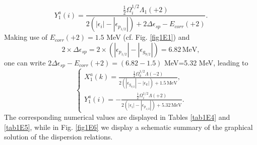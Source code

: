 \begin{equation}\label{eq3.5.8}
Y_1^a(i)=\frac{\frac{1}{2}\Omega_i^{1/2}\Lambda_1(+2)}{2(|\epsilon_i|-|\epsilon_{p_{1/2}}|)+2\Delta\epsilon_{sp}-E_{corr}(+2)}.
\end{equation}
Making use of $E_{corr}(+2)=1.5$ MeV (cf. Fig. \ref{fig1E1}) and 
\begin{equation}\label{eq3.5.9}
2\times\Delta\epsilon_{sp}=2\times(|\epsilon_{p_{1/2}}|-|\epsilon_{g_{9/2}}|)=6.82\,\text{MeV},
\end{equation}
one can write $2\Delta\epsilon_{sp}-E_{corr}(+2)=(6.82-1.5)$ MeV=5.32 MeV, leading to
\begin{equation}\label{eq3.5.10}
\left\{\begin{array}{c}
X_1^a(k)=\frac{\frac{1}{2}\Omega_k^{1/2}\Lambda(-2)}{2(|\epsilon_{g_{9/2}}|-|\epsilon_k|)+1.5\,\text{MeV}}, \\ 
Y_1^a(i)=-\frac{\frac{1}{2}\Omega_i^{1/2}\Lambda(+2)}{2(|\epsilon_i|-|\epsilon_{p_{1/2}}|)+5.32\,\text{MeV}}.
\end{array}\right.
\end{equation}
The corresponding numerical values are displayed in Tables \ref{tab1E4} and \ref{tab1E5}, while in Fig. \ref{fig1E6} we display a schematic summary of the graphical solution of the dispersion relations.

